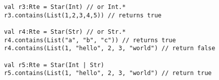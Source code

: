 \begin{lstlisting}[style=reclojureScala]
val r3:Rte = Star(Int) // or Int.*
r3.contains(List(1,2,3,4,5)) // returns true

val r4:Rte = Star(Str) // or Str.*
r4.contains(List("a", "b", "c")) // returns true
r4.contains(List(1, "hello", 2, 3, "world") // return false

val r5:Rte = Star(Int | Str) 
r5.contains(List(1, "hello", 2, 3, "world") // return true
\end{lstlisting}
